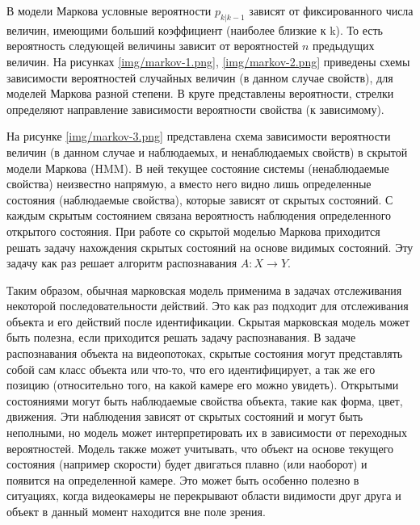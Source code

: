 В модели Маркова условные вероятности $p_{k|k-1}$ зависят от фиксированного числа величин, имеющими больший коэффициент (наиболее близкие к k). То есть вероятность следующей величины зависит от вероятностей $n$ предыдущих величин. На рисунках \ref{img/markov-1.png}, \ref{img/markov-2.png} приведены схемы зависимости вероятностей случайных величин (в данном случае свойств), для моделей Маркова разной степени. В круге представлены вероятности, стрелки определяют направление зависимости вероятности свойства (к зависимому). 



На рисунке \ref{img/markov-3.png} представлена схема зависимости вероятности величин (в данном случае и наблюдаемых, и ненаблюдаемых свойств) в скрытой модели Маркова (HMM). В ней текущее состояние системы (ненаблюдаемые свойства) неизвестно напрямую, а вместо него видно лишь определенные состояния (наблюдаемые свойства), которые зависят от скрытых состояний. С каждым скрытым состоянием связана вероятность наблюдения определенного открытого состояния. При работе со скрытой моделью Маркова приходится решать задачу нахождения скрытых состояний на основе видимых состояний. Эту задачу как раз решает алгоритм распознавания $A: X \rightarrow Y$.

Таким образом, обычная марковская модель применима в задачах отслеживания некоторой последовательности действий. Это как раз подходит для отслеживания объекта и его действий после идентификации. Скрытая марковская модель может быть полезна, если приходится решать задачу распознавания. В задаче распознавания объекта на видеопотоках, скрытые состояния могут представлять собой сам класс объекта или что-то, что его идентифицирует, а так же его позицию (относительно того, на какой камере его можно увидеть). Открытыми состояниями могут быть наблюдаемые свойства объекта, такие как форма, цвет, движения. Эти наблюдения зависят от скрытых состояний и могут быть неполными, но модель может интерпретировать их в зависимости от переходных вероятностей. Модель также может учитывать, что объект на основе текущего состояния (например скорости) будет двигаться плавно (или наоборот) и появится на определенной камере. Это может быть особенно полезно в ситуациях, когда видеокамеры не перекрывают области видимости друг друга и объект в данный момент находится вне поле зрения.

